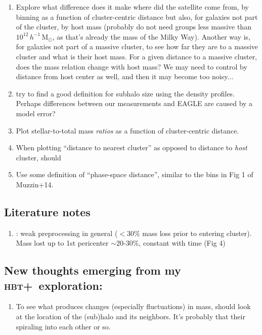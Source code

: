 \documentclass[usenatbib,fleqn]{mnras}
\newcommand{\hbt}{\textsc{hbt+}}
\newcommand{\Msun}{\mathrm{M}_\odot}
\begin{document}
\begin{enumerate}
  \item Explore what difference does it make where did the satellite come from, by binning as a function of cluster-centric distance but also, for galaxies not part of the cluster, by host mass (probably do not need groups less massive than $10^{12}\,h^{-1}\,\Msun$, as that's already the mass of the Milky Way). Another way is, for galaxies not part of a massive cluster, to see how far they are to a massive cluster and what is their host mass. For a given distance to a massive cluster, does the mass relation change with host mass? We may need to control by distance from host center as well, and then it may become too noisy...
  \item try to find a good definition for subhalo size using the density profiles. Perhaps differences between our measurements and EAGLE are caused by a model error?
  \item Plot stellar-to-total mass \emph{ratios} as a function of cluster-centric distance.
  \item When plotting ``distance to nearest cluster'' as opposed to distance to \emph{host} cluster, should 
  \item Use some definition of ``phase-space distance'', similar to the bins in Fig 1 of Muzzin+14.
\end{enumerate}

\subsection{Literature notes}

\begin{enumerate}
  \item \citet{rhee17}: weak preprocessing in general ($<30\%$ mass loss prior to entering cluster). Mass lost up to 1st pericenter $\sim$20-30\%, constant with time (Fig 4)
\end{enumerate}

\subsection{New thoughts emerging from my \hbt\ exploration:}
\begin{enumerate}
  \item To see what produces changes (especially fluctuations) in mass, should look at the location of the (sub)halo and its neighbors. It's probably that their spiraling into each other or so.
\end{enumerate}
\end{document}
